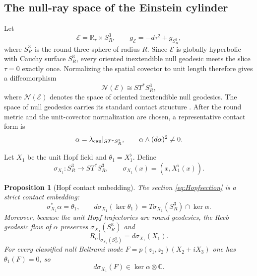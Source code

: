 \documentclass[aps,prd,reprint,nofootinbib,superscriptaddress]{revtex4-2}
\newtheorem{proposition}[theorem]{Proposition}
\theoremstyle{definition}
\theoremstyle{remark}
\newcommand{\R}{\mathbb{R}}
\newcommand{\C}{\mathbb{C}}
\begin{document}
\subsection{The null-ray space of the Einstein cylinder}

Let
\begin{equation}
 \mathcal E=\R_\tau\times S^3_R,
 \qquad
 g_{\mathcal E}=-d\tau^2+g_{S^3_R},
\end{equation}
where $S^3_R$ is the round three-sphere of radius $R$.  Since $\mathcal E$ is globally hyperbolic with Cauchy surface $S^3_R$, every oriented inextendible null geodesic meets the slice $\tau=0$ exactly once.  Normalizing the spatial covector to unit length therefore gives a diffeomorphism
\begin{equation}
 \mathcal N(\mathcal E)\cong ST^*S^3_R,
 \label{eq:nullrayST}
\end{equation}
where $\mathcal N(\mathcal E)$ denotes the space of oriented inextendible null geodesics.  The space of null geodesics carries its standard contact structure \cite{Low2001}.  After the round metric and the unit-covector normalization are chosen, a representative contact form is
\begin{equation}
 \alpha=\lambda_{\rm can}|_{ST^*S^3_R},
 \qquad
 \alpha\wedge(d\alpha)^2\neq0.
 \label{eq:nullraycontact}
\end{equation}

Let $X_1$ be the unit Hopf field and $\theta_1=X_1^\flat$.  Define
\begin{equation}
 \sigma_{X_1}:S^3_R\longrightarrow ST^*S^3_R,
 \qquad
 \sigma_{X_1}(x)=(x,X_1^\flat(x)).
 \label{eq:Hopfsection}
\end{equation}

\begin{proposition}[Hopf contact embedding]
\label{prop:HopfContactEmbedding}
The section \eqref{eq:Hopfsection} is a strict contact embedding:
\begin{equation}
 \sigma_{X_1}^*\alpha=\theta_1,
 \qquad
 d\sigma_{X_1}(\ker\theta_1)
 =T\sigma_{X_1}(S^3_R)\cap\ker\alpha.
 \label{eq:HopfContactIdentity}
\end{equation}
Moreover, because the unit Hopf trajectories are round geodesics, the Reeb geodesic flow of $\alpha$ preserves $\sigma_{X_1}(S^3_R)$ and
\begin{equation}
 R_\alpha|_{\sigma_{X_1}(S^3_R)}
 =d\sigma_{X_1}(X_1).
 \label{eq:ReebHopf}
\end{equation}
For every classified null Beltrami mode $F=p(z_1,z_2)(X_2+iX_3)$ one has $\theta_1(F)=0$, so
\begin{equation}
 d\sigma_{X_1}(F)\in\ker\alpha\otimes\C.
 \label{eq:BeltramiContactLift}
\end{equation}
\end{proposition}
\end{document}
